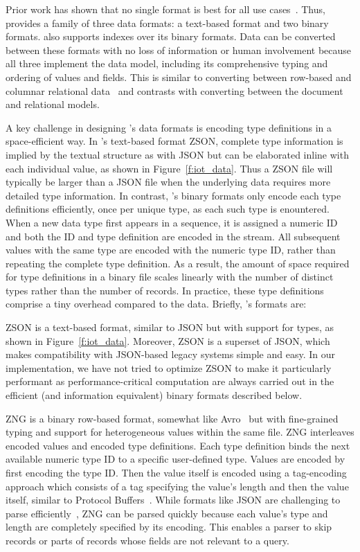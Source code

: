 Prior work has shown that no single format is best for all use cases~. Thus, \sys{} provides a family of three data formats: a text-based format and two binary formats. \sys{} also supports indexes over its binary formats. Data can be converted between these formats with no loss of information or human involvement because all three implement the \sys{} data model, including its comprehensive typing and ordering of values and fields. This is similar to converting between row-based and columnar relational data~\cite{h2o, peloton} and contrasts with converting between the document and relational models.

A key challenge in designing \sys{}'s data formats is encoding type definitions in a space-efficient way. In \sys{}'s text-based format ZSON, complete type information is implied by the textual structure as with JSON but can be elaborated inline with each individual value, as shown in Figure~\ref{f:iot_data}. Thus a ZSON file will typically be larger than a JSON file when the underlying data requires more detailed type information. In contrast, \sys{}'s binary formats only encode each type definitions efficiently, once per unique type, as each such type is enountered. When a new data type first appears in a sequence, it is assigned a numeric ID and both the ID and type definition are encoded in the stream. All subsequent values with the same type are encoded with the numeric type ID, rather than repeating the complete type definition. As a result, the amount of space required for type definitions in a binary \sys{} file scales linearly with the number of distinct types rather than the number of records. In practice, these type definitions comprise a tiny overhead compared to the data.  Briefly, \sys{}'s formats are:

 ZSON is a text-based format, similar to JSON but with support for types, as shown in Figure~\ref{f:iot_data}.  Moreover, ZSON is a superset of JSON, which makes compatibility with JSON-based legacy systems simple and easy.  In our implementation, we have not tried to optimize ZSON to make it particularly performant as performance-critical computation are always carried out in the efficient (and information equivalent) binary formats described below.

 ZNG is a binary row-based format, somewhat like Avro~\cite{avro} but with fine-grained typing and support for heterogeneous values within the same file. ZNG interleaves encoded values and encoded type definitions. Each type definition binds the next available numeric type ID to a specific user-defined type. Values are encoded by first encoding the type ID. Then the value itself is encoded using a tag-encoding approach which consists of a tag specifying the value's length and then the value itself, similar to Protocol Buffers~\cite{protobufs}. While formats like JSON are challenging to parse efficiently~, ZNG can be parsed quickly because each value's type and length are completely specified by its encoding. This enables a parser to skip records or parts of records whose fields are not relevant to a query.

